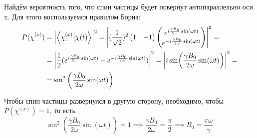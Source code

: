Найдём вероятность того, что спин частицы будет повернут антипараллельно оси x. Для этого воспользуемся правилом Борна:
\begin{align*}
P(\chi^{(x)}_-) &= \left|\bra{\chi^{(x)}_-}\ket{\chi(t)}\right|^2 = \left|(\frac{1}{\sqrt{2}})^2\begin{pmatrix}1 & -1\end{pmatrix}\begin{pmatrix} e^{i\frac{\gamma B_0}{2\omega}\sin(\omega t)} \\ e^{-i\frac{\gamma B_0}{2\omega}\sin(\omega t)} \end{pmatrix}\right|^2 = \\ &= \left|\frac{1}{2}(e^{i\frac{\gamma B_0}{2\omega}\sin(\omega t)} - e^{-i\frac{\gamma B_0}{2\omega}\sin(\omega t)})\right|^2 = \left|i\sin(\frac{\gamma B_0}{2\omega}\sin(\omega t))\right|^2 = \\
 & = \sin^2\left(\frac{\gamma B_0}{2\omega}\sin(\omega t)\right)
\end{align*}

Чтобы спин частицы развернулся в другую сторону, необходимо, чтобы $P(\chi^{(x)}_-) = 1$, то есть
\[
\sin^2\left(\frac{\gamma B_0}{2\omega}\sin(\omega t)\right) = 1 \implies \frac{\gamma B_0}{2\omega} = \frac{\pi}{2} \implies B_0 = \frac{\pi\omega}{\gamma}
\]

